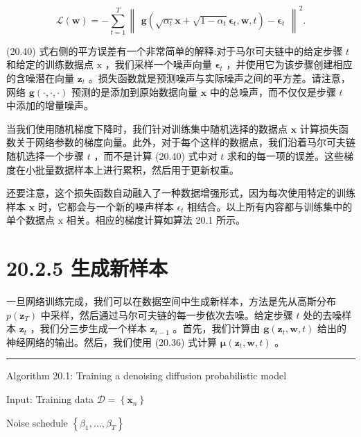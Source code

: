 \documentclass[10pt]{article}
\newcommand{\HRule}{\begin{center}\rule{0.9\linewidth}{0.2mm}\end{center}}
\begin{document}
\[
\mathcal{L}\left( \mathbf{w}\right)  =  - \mathop{\sum }\limits_{{t = 1}}^{T}{\begin{Vmatrix}\mathbf{g}\left( \sqrt{{\alpha }_{t}}\mathbf{x} + \sqrt{1 - {\alpha }_{t}}{\mathbf{\epsilon }}_{t},\mathbf{w},t\right)  - {\mathbf{\epsilon }}_{t}\end{Vmatrix}}^{2}. \tag{20.40}
\]

(20.40) 式右侧的平方误差有一个非常简单的解释:对于马尔可夫链中的给定步骤 \(t\) 和给定的训练数据点 \(\mathrm{x}\) ，我们采样一个噪声向量 \({\mathbf{\epsilon }}_{t}\) ，并使用它为该步骤创建相应的含噪潜在向量 \({\mathbf{z}}_{t}\) 。损失函数就是预测噪声与实际噪声之间的平方差。请注意，网络 \(\mathbf{g}\left( {\cdot ,\cdot , \cdot  }\right)\) 预测的是添加到原始数据向量 \(\mathbf{x}\) 中的总噪声，而不仅仅是步骤 \(t\) 中添加的增量噪声。

当我们使用随机梯度下降时，我们针对训练集中随机选择的数据点 \(\mathbf{x}\) 计算损失函数关于网络参数的梯度向量。此外，对于每个这样的数据点，我们沿着马尔可夫链随机选择一个步骤 \(t\) ，而不是计算 (20.40) 式中对 \(t\) 求和的每一项的误差。这些梯度在小批量数据样本上进行累积，然后用于更新权重。

还要注意，这个损失函数自动融入了一种数据增强形式，因为每次使用特定的训练样本 \(\mathbf{x}\) 时，它都会与一个新的噪声样本 \({\epsilon }_{t}\) 相结合。以上所有内容都与训练集中的单个数据点 \(\mathrm{x}\) 相关。相应的梯度计算如算法 20.1 所示。

\section*{20.2.5 生成新样本}

一旦网络训练完成，我们可以在数据空间中生成新样本，方法是先从高斯分布 \(p\left( {\mathbf{z}}_{T}\right)\) 中采样，然后通过马尔可夫链的每一步依次去噪。给定步骤 \(t\) 处的去噪样本 \({\mathbf{z}}_{t}\) ，我们分三步生成一个样本 \({\mathbf{z}}_{t - 1}\) 。首先，我们计算由 \(\mathbf{g}\left( {{\mathbf{z}}_{t},\mathbf{w},t}\right)\) 给出的神经网络的输出。然后，我们使用 (20.36) 式计算 \(\mathbf{\mu }\left( {{\mathbf{z}}_{t},\mathbf{w},t}\right)\) 。

\HRule

Algorithm 20.1: Training a denoising diffusion probabilistic model

\hspace*{1em} Input: Training data \(\mathcal{D} = \left\{  {\mathbf{x}}_{n}\right\}\)

\hspace*{4em} Noise schedule \(\left\{  {{\beta }_{1},\ldots ,{\beta }_{T}}\right\}\)
\end{document}
